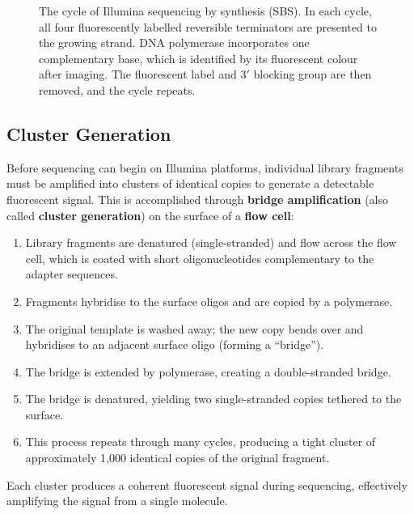 \begin{figure}[htbp]
\caption[Sequencing by synthesis (SBS) principle.]{The cycle of Illumina sequencing by synthesis (SBS). In each cycle, all four fluorescently labelled reversible terminators are presented to the growing strand. DNA polymerase incorporates one complementary base, which is identified by its fluorescent colour after imaging. The fluorescent label and 3$'${} blocking group are then removed, and the cycle repeats.}
\label{fig:seqprinciples:sbs}
\end{figure}

\subsection{Cluster Generation}
\label{subsec:seqprinciples:clusters}

Before sequencing can begin on Illumina platforms, individual library fragments must be amplified into clusters of identical copies to generate a detectable fluorescent signal. This is accomplished through \textbf{bridge amplification} (also called \textbf{cluster generation}) on the surface of a \textbf{flow cell}:

\begin{enumerate}[itemsep=2pt]
  \item Library fragments are denatured (single-stranded) and flow across the flow cell, which is coated with short oligonucleotides complementary to the adapter sequences.
  \item Fragments hybridise to the surface oligos and are copied by a polymerase.
  \item The original template is washed away; the new copy bends over and hybridises to an adjacent surface oligo (forming a ``bridge'').
  \item The bridge is extended by polymerase, creating a double-stranded bridge.
  \item The bridge is denatured, yielding two single-stranded copies tethered to the surface.
  \item This process repeats through many cycles, producing a tight cluster of approximately 1,000 identical copies of the original fragment.
\end{enumerate}

Each cluster produces a coherent fluorescent signal during sequencing, effectively amplifying the signal from a single molecule.

